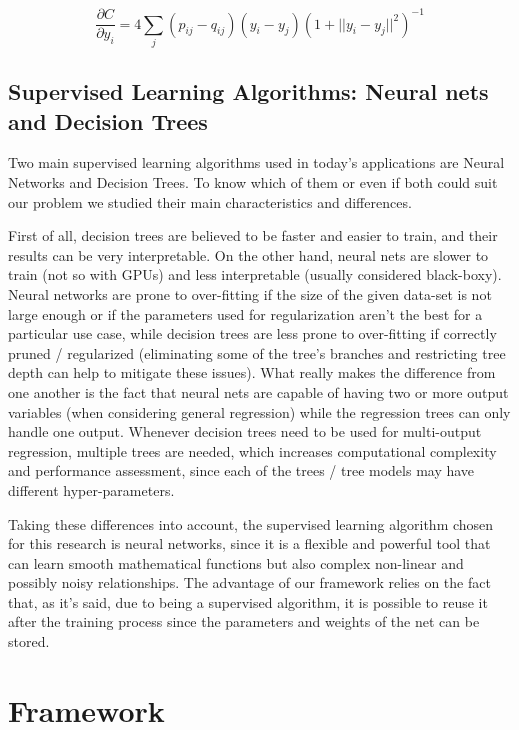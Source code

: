 \documentclass[a4paper,11pt,spanish]{report}
\begin{document}
$$ \frac{\partial C}{\partial y_{i}} = 4 \sum\limits_j (p_{ij} - q_{ij}) (y_{i} - y_{j}) (1+ ||y_{i}-y_{j}||^2)^{-1}$$

\section{Supervised Learning Algorithms: Neural nets and Decision Trees}
\label{supervised}

Two main supervised learning algorithms used in today's applications are Neural Networks and Decision Trees. To know which of them or even if both could suit our problem we studied their main characteristics and differences.

First of all, decision trees are believed to be faster and easier to train, and their results can be very interpretable. On the other hand, neural nets are slower to train (not so with GPUs) and less interpretable (usually considered black-boxy). Neural networks are prone to over-fitting if the size of the given data-set is not large enough or if the parameters used for regularization aren't the best for a particular use case, while decision trees are less prone to over-fitting if correctly pruned / regularized (eliminating some of the tree's branches and restricting tree depth can help to mitigate these issues). What really makes the difference from one another is the fact that neural nets are capable of having two or more output variables (when considering general regression) while the regression trees can only handle one output. Whenever decision trees need to be used for multi-output regression, multiple trees are needed, which increases computational complexity and performance assessment, since each of the trees / tree models may have different hyper-parameters.

Taking these differences into account, the supervised learning algorithm chosen for this research is neural networks, since it is a flexible and powerful tool that can learn smooth mathematical functions but also complex non-linear and possibly noisy relationships. The advantage of our framework relies on the fact that, as it's said, due to being a supervised algorithm, it is possible to reuse it after the training process since the parameters and weights of the net can be stored.


\chapter{Framework}
\label{chap:frame}
\end{document}

